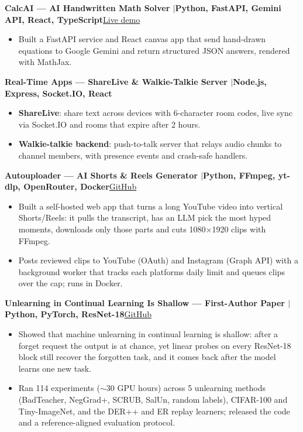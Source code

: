 \documentclass[10pt,a4paper]{article}
\newcommand{\entry}[2]{\par\textbf{#1}\hfill #2\par}
\newenvironment{points}{\vspace{-4pt}\begin{itemize}\setlength{\itemsep}{0pt}\setlength{\parskip}{0pt}\setlength{\topsep}{0pt}\setlength{\partopsep}{0pt}\setlength{\leftmargin}{12pt}}{\end{itemize}\vspace{-2pt}}
\newcommand{\sep}{\enspace$|$\enspace}
\begin{document}
\entry{CalcAI --- AI Handwritten Math Solver \textnormal{\sep Python, FastAPI, Gemini API, React, TypeScript}}{\href{https://calcai-50046872763.development.catalystappsail.in}{Live demo}}
\begin{points}
  \item Built a FastAPI service and React canvas app that send hand-drawn equations to Google Gemini and return structured JSON answers, rendered with MathJax.
\end{points}
\entry{Real-Time Apps --- ShareLive \& Walkie-Talkie Server \textnormal{\sep Node.js, Express, Socket.IO, React}}{}
\begin{points}
  \item \textbf{ShareLive}: share text across devices with 6-character room codes, live sync via Socket.IO and rooms that expire after 2 hours.
  \item \textbf{Walkie-talkie backend}: push-to-talk server that relays audio chunks to channel members, with presence events and crash-safe handlers.
\end{points}

\entry{Autouploader --- AI Shorts \& Reels Generator \textnormal{\sep Python, FFmpeg, yt-dlp, OpenRouter, Docker}}{\href{https://github.com/Adarshmilan/autouploader}{GitHub}}
\begin{points}
  \item Built a self-hosted web app that turns a long YouTube video into vertical Shorts/Reels: it pulls the transcript, has an LLM pick the most hyped moments, downloads only those parts and cuts 1080$\times$1920 clips with FFmpeg.
  \item Posts reviewed clips to YouTube (OAuth) and Instagram (Graph API) with a background worker that tracks each platforms daily limit and queues clips over the cap; runs in Docker.
\end{points}
\entry{Unlearning in Continual Learning Is Shallow --- First-Author Paper \textnormal{\sep Python, PyTorch, ResNet-18}}{\href{https://github.com/Adarshmilan/CUL-continual-unlearning-}{GitHub}}
\begin{points}
  \item Showed that machine unlearning in continual learning is shallow: after a forget request the output is at chance, yet linear probes on every ResNet-18 block still recover the forgotten task, and it comes back after the model learns one new task.
  \item Ran 114 experiments ($\sim$30 GPU hours) across 5 unlearning methods (BadTeacher, NegGrad+, SCRUB, SalUn, random labels), CIFAR-100 and Tiny-ImageNet, and the DER++ and ER replay learners; released the code and a reference-aligned evaluation protocol.
\end{points}
\end{document}
